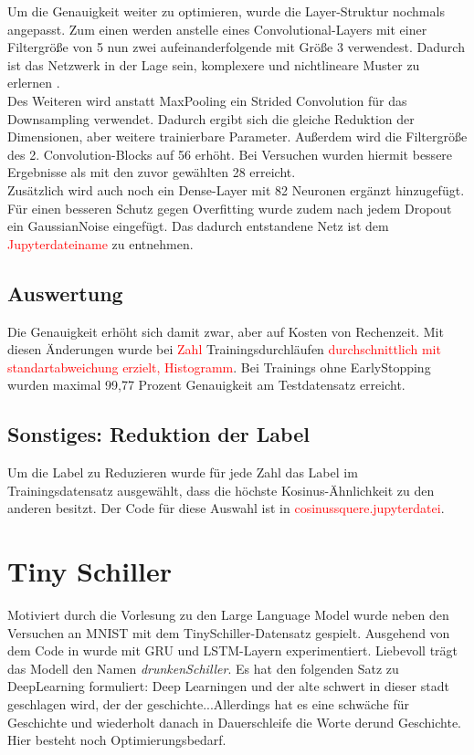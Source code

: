 \documentclass[
fontsize=12pt,					%
paper=a4,						%
twoside=false, 					%
listof=totoc, 					%
bibliography=totoc,				%
titlepage, 						%
headsepline, 					%
DIV=12,							%
BCOR=6mm,						%
cleardoublepage=empty,			%
parskip,							%
ngerman
]{scrartcl}
\begin{document}
Um die Genauigkeit weiter zu optimieren, wurde die Layer-Struktur nochmals angepasst. Zum einen werden anstelle eines Convolutional-Layers mit einer Filtergröße von 5 nun zwei aufeinanderfolgende mit Größe 3 verwendest. Dadurch ist das Netzwerk in der Lage sein, komplexere und nichtlineare Muster zu erlernen \autocite{Riad.2022}.\\
Des Weiteren wird anstatt MaxPooling ein Strided Convolution für das Downsampling verwendet. Dadurch ergibt sich die gleiche Reduktion der Dimensionen, aber weitere trainierbare Parameter. Außerdem wird die Filtergröße des 2. Convolution-Blocks auf 56 erhöht. Bei Versuchen wurden hiermit bessere Ergebnisse als mit den zuvor gewählten 28 erreicht.\\
Zusätzlich wird auch noch ein Dense-Layer mit 82 Neuronen ergänzt hinzugefügt. Für einen besseren Schutz gegen Overfitting wurde zudem nach jedem Dropout ein GaussianNoise eingefügt. Das dadurch entstandene Netz ist dem \textcolor{red}{Jupyterdateiname} zu entnehmen.

\subsection{Auswertung}

Die Genauigkeit erhöht sich damit zwar, aber auf Kosten von Rechenzeit. Mit diesen Änderungen wurde bei \textcolor{red}{Zahl} Trainingsdurchläufen \textcolor{red}{durchschnittlich mit standartabweichung erzielt, Histogramm}.
Bei Trainings ohne EarlyStopping wurden maximal 99,77 Prozent Genauigkeit am Testdatensatz erreicht.

\subsection{Sonstiges: Reduktion der Label}

Um die Label zu Reduzieren wurde für jede Zahl das Label im Trainingsdatensatz ausgewählt, dass die höchste Kosinus-Ähnlichkeit zu den anderen besitzt. Der Code für diese Auswahl ist in \textcolor{red}{cosinussquere.jupyterdatei}.

\section{Tiny Schiller}

Motiviert durch die Vorlesung zu den Large Language Model wurde neben den Versuchen an MNIST mit dem TinySchiller-Datensatz \autocite{Schutera.2023} \glqq gespielt\grqq. Ausgehend von dem Code in \autocite{Bansal.2021} wurde mit GRU und LSTM-Layern experimentiert. Liebevoll trägt das Modell den Namen \emph{drunkenSchiller}. Es hat den folgenden Satz zu DeepLearning formuliert: \glqq Deep Learningen und der alte schwert in dieser stadt geschlagen wird, der der geschichte...\grqq Allerdings hat es eine schwäche für Geschichte und wiederholt danach in Dauerschleife die Worte \glqq der\grqq und \glqq Geschichte\grqq. Hier besteht noch Optimierungsbedarf.

\clearpage
\printbibliography
\end{document}
